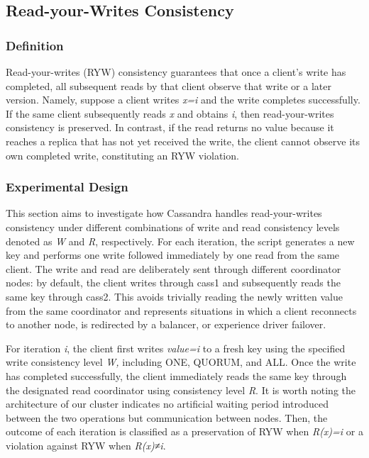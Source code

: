 \subsection{Read-your-Writes Consistency}\label{ryw:read-your-writes-consistency}

\subsubsection{Definition}\label{ryw:definition}

Read-your-writes (RYW) consistency guarantees that once a client's write has completed, all subsequent reads by that client observe that write or a later version. Namely, suppose a client writes \emph{x=i} and the write completes successfully. If the same client subsequently reads \emph{x} and obtains \emph{i}, then read-your-writes consistency is preserved. In contrast, if the read returns no value because it reaches a replica that has not yet received the write, the client cannot observe its own completed write, constituting an RYW violation.

\subsubsection{Experimental Design}\label{ryw:experimental-design}

This section aims to investigate how Cassandra handles read-your-writes consistency under different combinations of write and read consistency levels denoted as \emph{W} and \emph{R}, respectively. For each iteration, the script generates a new key and performs one write followed immediately by one read from the same client. The write and read are deliberately sent through different coordinator nodes: by default, the client writes through cass1 and subsequently reads the same key through cass2. This avoids trivially reading the newly written value from the same coordinator and represents situations in which a client reconnects to another node, is redirected by a balancer, or experience driver failover.

For iteration \emph{i}, the client first writes \emph{value=i} to a fresh key using the specified write consistency level \emph{W,} including ONE, QUORUM, and ALL. Once the write has completed successfully, the client immediately reads the same key through the designated read coordinator using consistency level \emph{R}. It is worth noting the architecture of our cluster indicates no artificial waiting period introduced between the two operations but communication between nodes. Then, the outcome of each iteration is classified as a preservation of RYW when \emph{R(x)=i} or a violation against RYW when \emph{R(x)≠i}.

